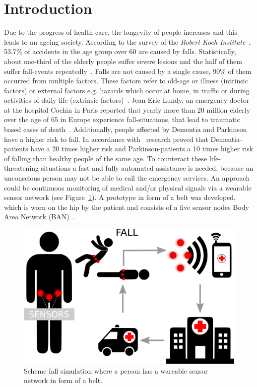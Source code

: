 \documentclass[review]{elsarticle}
\begin{document}
\section{Introduction}

Due to the progress of health care, the longevity of people increases and this leads to an ageing society. %
According to the survey of the \textit{Robert Koch Institute}~\cite{Varnaccia2013}, 53.7\% of accidents in the age 
group over 60 are caused by falls. Statistically, about one-third of the elderly people suffer severe lesions and the half of them suffer 
fall-events repeatedly~\cite{Schott2008}. Falls are not caused by a single cause, 90\% of them occurred from multiple factors. These 
factors refer to old-age or illness (intrinsic factors) or external factors e.g. hazards which occur at home, in traffic or during activities 
of daily life (extrinsic factors)~\cite{Schott2008}. Jean-Eric Lundy, an emergency doctor at the hospital Cochin in Paris reported that yearly more than 20 million 
elderly over the age of 65 in Europe experience fall-situations, that lead to traumatic based cases of death~\cite{APAOTS2013}. 
Additionally, people affected by Dementia and Parkinson have a higher risk to fall. In accordance with~\cite{Monks} research proved that 
Dementia-patients have a 20 times higher risk and Parkinson-patients a 10 times higher risk of falling than healthy people of the same age. 
To counteract these life-threatening situations a fast and fully automated assistance is needed, because an unconscious person may not be 
able to call the emergency services. An approach could be continuous monitoring of medical and/or physical signals via a wearable sensor 
network (see Figure~\ref{fig:escalationscheme}). A prototype in form of a belt was developed, which is worn on the hip by the patient and consists 
of a five sensor nodes Body Area Network (BAN)~\cite{LaBlunda.2016,LaBlunda.2016b}. 

\begin{figure}[!ht]
  \centering
  \includegraphics[scale=0.15]{img/Figure1}
  \caption[Escalation scheme]{Scheme fall simulation where a person has a wareable sensor network in form of a belt.~\cite{LaBlunda.2016,LaBlunda.2016b}}
  \label{fig:escalationscheme}
\end{figure}
\end{document}
